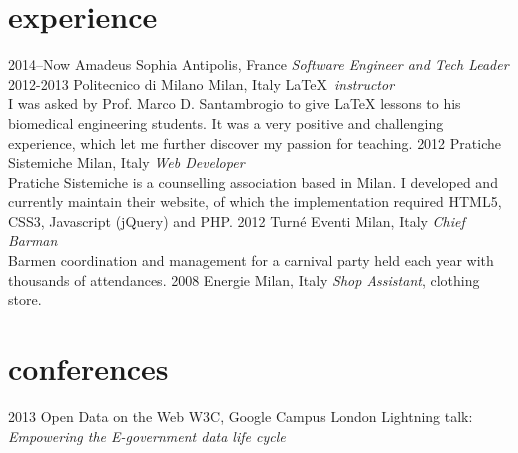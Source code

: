\documentclass[]{friggeri-cv} %
\begin{document}
\section{experience}

\begin{entrylist}
\entry
{2014--Now}
{Amadeus}
{Sophia Antipolis, France}
{\emph{Software Engineer and Tech Leader} \\
}
\entry
{2012-2013}
{Politecnico di Milano}
{Milan, Italy}
{\LaTeX~\emph{instructor} \\
I was asked by Prof. Marco D. Santambrogio to give \LaTeX{} lessons to his biomedical engineering students.
It was a very positive and challenging experience, which let me further discover my passion for teaching.
}
\entry
{2012}
{Pratiche Sistemiche}
{Milan, Italy}
{\emph{Web Developer} \\
Pratiche Sistemiche is a counselling association based in Milan. I developed and currently
  maintain their website, of which the implementation required HTML5, CSS3, Javascript (jQuery)
  and PHP.
}
\entry
{2012}
{Turné Eventi}
{Milan, Italy}
{\emph{Chief Barman} \\
Barmen coordination and management for a carnival party held each year with thousands of attendances.
}
\entry
{2008}
{Energie}
{Milan, Italy}
{\emph{Shop Assistant}, clothing store.}
\end{entrylist}

\newpage

\section{conferences}

\begin{entrylist}
\entry
{2013}
{Open Data on the Web}
{W3C, Google Campus London}
{Lightning talk: \emph{Empowering the E-government data life cycle}}
\end{entrylist}
\end{document}
